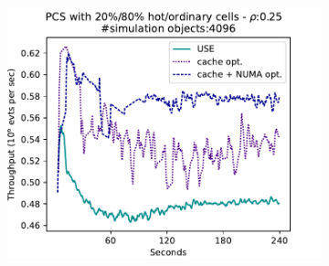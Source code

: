 \documentclass[]{article}
\begin{document}
\begin{figure}[!h]
\centering
\begin{subfigure}[b]{\mysize}
\centering
\includegraphics[width=\linewidth]{figures_original/results-pcs-hs-0.48-pcs_hs-240-1.pdf}
\renewcommand{\thesubfigure}{Original}
\caption{}
\end{subfigure}



\end{figure}
\end{document}
